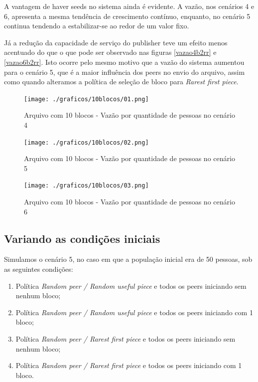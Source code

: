 \documentclass[a4paper,10pt]{article}
\begin{document}
A vantagem de haver seeds no sistema ainda é evidente. A vazão, nos cenários 4 e 6, apresenta a mesma tendência de crescimento contínuo, enquanto, no cenário 5 continua tendendo a estabilizar-se ao redor de um valor fixo.

Já a redução da capacidade de serviço do publisher teve um efeito menos acentuado do que o que pode ser observado nas figuras \ref{vazao4b2rr} e \ref{vazao6b2rr}. Isto ocorre pelo mesmo motivo que a vazão do sistema aumentou para o cenário 5, que é a maior influência dos peers no envio do arquivo, assim como quando alteramos a política de seleção de bloco para \textit{Rarest first piece}.

\vspace{3cm}

\begin{figure}[h]
	\caption{Arquivo com 10 blocos - Vazão por quantidade de pessoas no cenário 4}
	\label{vazao4b10}
	\texttt{[image: ./graficos/10blocos/01.png]}
\end{figure}

\clearpage
\pagebreak

\begin{figure}
	\caption{Arquivo com 10 blocos - Vazão por quantidade de pessoas no cenário 5}
	\label{vazao5b10}
	\texttt{[image: ./graficos/10blocos/02.png]}
\end{figure}

\begin{figure}
	\caption{Arquivo com 10 blocos - Vazão por quantidade de pessoas no cenário 6}
	\label{vazao6b10}
	\texttt{[image: ./graficos/10blocos/03.png]}
\end{figure}

\clearpage
\pagebreak

\subsection{Variando as condições iniciais}

Simulamos o cenário 5, no caso em que a população inicial era de 50 pessoas, sob as seguintes condições:
\begin{enumerate}
	\item Política \textit{Random peer / Random useful piece} e todos os peers iniciando sem nenhum bloco;
	\item Política \textit{Random peer / Random useful piece} e todos os peers iniciando com 1 bloco;
	\item Política \textit{Random peer / Rarest first piece} e todos os peers iniciando sem nenhum bloco;
	\item Política \textit{Random peer / Rarest first piece} e todos os peers iniciando com 1 bloco.
\end{enumerate}
\end{document}
